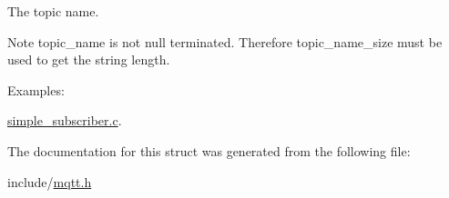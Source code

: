 The topic name. 

\begin{DoxyNote}{Note}
topic\+\_\+name is not null terminated. Therefore topic\+\_\+name\+\_\+size must be used to get the string length. 
\end{DoxyNote}
\begin{Desc}
\item[Examples\+: ]\par
\hyperlink{simple_subscriber_8c-example}{simple\+\_\+subscriber.\+c}.\end{Desc}


The documentation for this struct was generated from the following file\+:\begin{DoxyCompactItemize}
\item 
include/\hyperlink{mqtt_8h}{mqtt.\+h}\end{DoxyCompactItemize}
